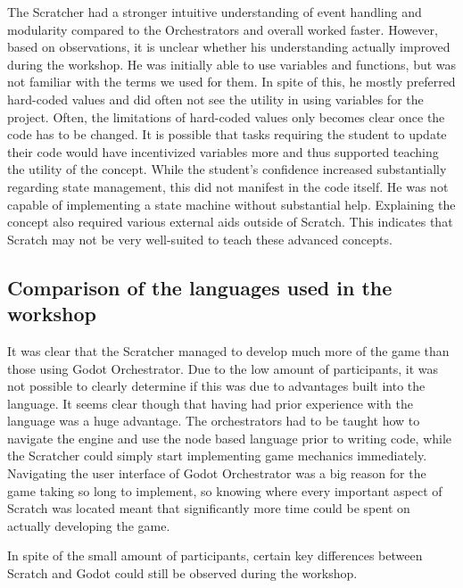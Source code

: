 The Scratcher had a stronger intuitive understanding of event handling and modularity compared to the Orchestrators and overall worked faster. However, based on observations, it is unclear whether his understanding actually improved during the workshop. He was initially able to use variables and functions, but was not familiar with the terms we used for them. In spite of this, he mostly preferred hard-coded values and did often not see the utility in using variables for the project. Often, the limitations of hard-coded values only becomes clear once the code has to be changed. It is possible that tasks requiring the student to update their code would have incentivized variables more and thus supported teaching the utility of the concept. While the student's confidence increased substantially regarding state management, this did not manifest in the code itself. He was not capable of implementing a state machine without substantial help. Explaining the concept also required various external aids outside of Scratch. This indicates that Scratch may not be very well-suited to teach these advanced concepts.

\subsection{Comparison of the languages used in the workshop}
It was clear that the Scratcher managed to develop much
more of the game than those using Godot Orchestrator.
Due to the low
amount of participants, it was not possible to clearly determine if
this was due to advantages built into the language.
It seems clear
though that having had prior experience with the language was a huge
advantage.
The orchestrators had to be taught how to
navigate the engine and use the node based language prior to writing
code, while the Scratcher could simply start implementing game
mechanics immediately.
Navigating the user interface of Godot
Orchestrator was a big reason for the game taking so long to
implement, so knowing where every important aspect of Scratch was
located meant that significantly more time could be spent on actually
developing the game.

In spite of the small amount of participants, certain key differences
between Scratch and Godot could still be observed during the
workshop.

